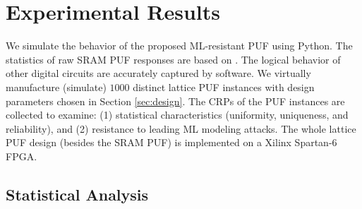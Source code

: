 \section{Experimental Results}
\label{sec:result}

We simulate the behavior of the proposed ML-resistant PUF using Python. 
The statistics of raw SRAM PUF responses are based on \cite{maes2013accurate, maes2009soft}. 
The logical behavior of other digital circuits are accurately captured by software. 
We virtually manufacture (simulate) $1000$ distinct lattice PUF instances with design parameters chosen in Section \ref{sec:design}. 
The CRPs of the PUF instances are collected to examine: (1) statistical characteristics (uniformity, uniqueness, and reliability), and (2) resistance to leading ML modeling attacks. 
The whole lattice PUF design (besides the SRAM PUF) is implemented on a Xilinx Spartan-6 FPGA.


\subsection{Statistical Analysis}
\label{sec:statistical_result}



